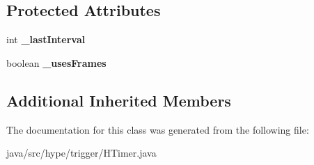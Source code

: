 \subsection*{Protected Attributes}
\begin{DoxyCompactItemize}
\item 
\hypertarget{classhype_1_1trigger_1_1_h_timer_a172caaedb3f2ef2fcb7b3a0a1aef17d3}{int {\bfseries \-\_\-last\-Interval}}\label{classhype_1_1trigger_1_1_h_timer_a172caaedb3f2ef2fcb7b3a0a1aef17d3}

\item 
\hypertarget{classhype_1_1trigger_1_1_h_timer_a9765f8be860ff8b30120cdddc85fe4e7}{boolean {\bfseries \-\_\-uses\-Frames}}\label{classhype_1_1trigger_1_1_h_timer_a9765f8be860ff8b30120cdddc85fe4e7}

\end{DoxyCompactItemize}
\subsection*{Additional Inherited Members}


The documentation for this class was generated from the following file\-:\begin{DoxyCompactItemize}
\item 
java/src/hype/trigger/H\-Timer.\-java\end{DoxyCompactItemize}

